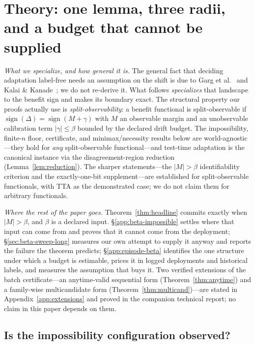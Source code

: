 \documentclass[conference]{IEEEtran}
\theoremstyle{plain}
\theoremstyle{definition}
\newcommand{\sign}{\operatorname{sign}}
\begin{document}
\section{Theory: one lemma, three radii, and a budget that cannot be supplied}\label{sec:theory}\label{sec:bsfrontier}\label{sec:gmeter}
\noindent\emph{What we specialize, and how general it is.} The general fact that deciding
adaptation label-free needs an assumption on the shift is due to Garg et
al.~\cite{garg2022atc} and Kalai \& Kanade~\cite{kalai2021abstain}; we do not re-derive it.
What follows \emph{specializes} that landscape to the benefit sign and makes its boundary
exact. The structural property our proofs actually use is \emph{split-observability}: a benefit
functional is split-observable if $\sign(\Delta)=\sign(M+\gamma)$ with $M$ an observable margin
and an unobservable calibration term $|\gamma|\le\beta$ bounded by the declared drift budget.
The impossibility, finite-$n$ floor, certificate, and minimax/necessity results below are
world-agnostic---they hold for \emph{any} split-observable functional---and test-time adaptation
is the canonical instance via the disagreement-region reduction (Lemma~\ref{lem:reduction}). The
sharper statements---the $|M|>\beta$ identifiability criterion and the exactly-one-bit
supplement---are established for split-observable functionals, with TTA as the demonstrated case;
we do not claim them for arbitrary functionals.


\noindent\emph{Where the rest of the paper goes.} Theorem~\ref{thm:headline} commits exactly
when $|M|>\beta$, and $\beta$ is a declared input. \S\ref{app:beta-impossible} settles where that
input can come from and proves that it cannot come from the deployment;
\S\ref{sec:beta-sweep-long} measures our own attempt to supply it anyway and reports the failure the
theorem predicts; \S\ref{app:episode-beta} identifies the one structure under which a budget is
estimable, prices it in logged deployments and historical labels, and measures the assumption that
buys it. Two verified extensions of the batch certificate---an anytime-valid sequential form
(Theorem~\ref{thm:anytime}) and a family-wise multicandidate form
(Theorem~\ref{thm:multicand})---are stated in Appendix~\ref{app:extensions} and proved in the
companion technical report; no claim in this paper depends on them.

\begingroup\sloppy

\endgroup

\subsection{Is the impossibility configuration observed?}\label{sec:necessity-observed}

\end{document}
